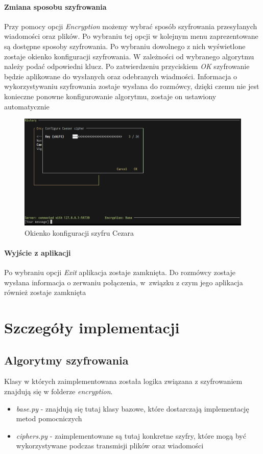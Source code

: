 \documentclass{article}
\begin{document}
    \paragraph{Zmiana sposobu szyfrowania}
      Przy pomocy opcji \emph{Encryption} możemy wybrać sposób szyfrowania przesyłanych wiadomości oraz plików.
      Po wybraniu tej opcji w kolejnym menu zaprezentowane są dostępne sposoby szyfrowania. Po wybraniu dowolnego z
      nich wyświetlone zostaje okienko konfiguracji szyfrowania. W zależności od wybranego algorytmu należy podać
      odpowiedni klucz. Po zatwierdzeniu przyciskiem \emph{OK} szyfrowanie będzie aplikowane do wysłanych oraz
      odebranych wiadmości. Informacja o wykorzystywaniu szyfrowania zostaje wysłana do rozmówcy, dzięki czemu nie
      jest konieczne ponowne konfigurowanie algorytmu, zostaje on ustawiony automatycznie

    \begin{figure}[H]
        \centering
        \includegraphics[scale=0.4]{caesar_cipher_configuration}
        \caption{Okienko konfiguracji szyfru Cezara}
        \label{CIPHER_CONFIGURATION}
    \end{figure}

    \paragraph{Wyjście z aplikacji}
      Po wybraniu opcji \emph{Exit} aplikacja zostaje zamknięta. Do rozmówcy zostaje wysłana informacja o
      zerwaniu połączenia, w~związku z czym jego aplikacja również zostaje zamknięta

  \section{Szczegóły implementacji}
    \subsection{Algorytmy szyfrowania}
    Klasy w których zaimplementowana została logika związana z szyfrowaniem znajdują się w folderze \emph{encryption}.
    \begin{itemize}
            \item \emph{base.py} - znajdują się tutaj klasy bazowe, które dostarczają implementację metod pomocniczych
            \item \emph{ciphers.py} - zaimplementowane są tutaj konkretne szyfry, które mogą być wykorzystywane podczas
                transmisji plików oraz wiadomości
    \end{itemize}
\end{document}
